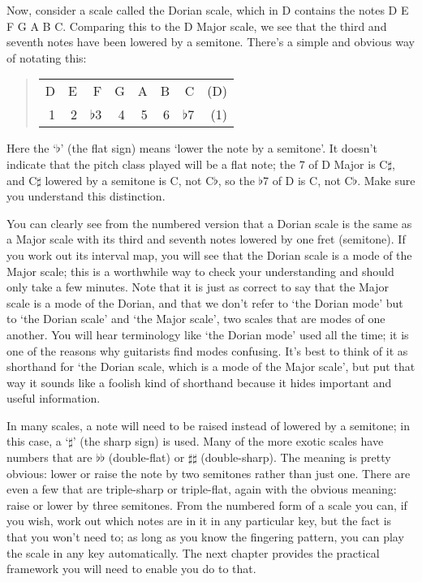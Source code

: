 \documentclass[english]{./gbook}
\begin{document}
\begin{large}
Now, consider a scale called the Dorian scale, which in D contains the notes D E F G A B C. Comparing this to the D Major scale, we see that the third and seventh notes have been lowered by a semitone. There's a simple and obvious way of notating this:
\begin{quote}
\begin{tabular}{rrrrrrrr}
D	&E	&F	&G	&A	&B	&C	&(D) \\
1	&2	&$\flat$3	&4	&5	&6	&$\flat$7	&(1)
\end{tabular}
\end{quote}
Here the `$\flat$' (the flat sign) means `lower the note by a semitone'. It doesn't indicate that the pitch class played will be a flat note; the 7 of D Major is C$\sharp$, and C$\sharp$ lowered by a semitone is C, not C$\flat$, so the $\flat$7 of D is C, not C$\flat$. Make sure you understand this distinction. 

You can clearly see from the numbered version that a Dorian scale is the same as a Major scale with its third and seventh notes lowered by one fret (semitone). If you work out its interval map, you will see that the Dorian scale is a mode of the Major scale; this is a worthwhile way to check your understanding and should only take a few minutes. Note that it is just as correct to say that the Major scale is a mode of the Dorian, and that we don't refer to `the Dorian mode' but to `the Dorian scale' and `the Major scale', two scales that are modes of one another. You will hear terminology like `the Dorian mode' used all the time; it is one of the reasons why guitarists find modes confusing. It's best to think of it as shorthand for `the Dorian scale, which is a mode of the Major scale', but put that way it sounds like a foolish kind of shorthand because it hides important and useful information.

In many scales, a note will need to be raised instead of lowered by a semitone; in this case, a `$\sharp$' (the sharp sign) is used. Many of the more exotic scales have numbers that are $\flat\flat$ (double-flat) or $\sharp\sharp$ (double-sharp). The meaning is pretty obvious: lower or raise the note by two semitones rather than just one. There are even a few that are triple-sharp or triple-flat, again with the  obvious meaning: raise or lower by three semitones. From the numbered form of a scale you can, if you wish, work out which notes are in it in any particular key, but the fact is that you won't need to; as long as you know the fingering pattern, you can play the scale in any key automatically. The next chapter provides the practical framework you will need to enable you do to that.


\end{large}
\end{document}
